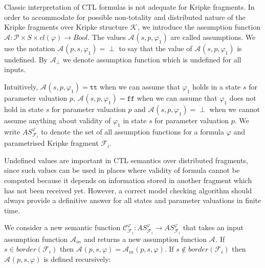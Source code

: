\documentclass[12pt,oneside]{fithesis2}
\newcommand{\as}[1][]{\ensuremath{\mathcal{A}_{#1}}}
\newcommand{\asemt}{\as[\perp]}
\newcommand{\ain}{\mathcal{A}_{in}}
\newcommand{\ASphi}{\ensuremath{AS_{\kf{i}{}}^\varphi}}
\newcommand{\sem}{\ensuremath{\mathcal{C}_{\kf{i}{}}^\varphi}}
\newcommand{\true}{\ensuremath{\texttt{tt}}}
\newcommand{\false}{\ensuremath{\texttt{ff}}}
\newcommand{\ks}[1][]{\ensuremath{\mathcal{K}_{#1}}}
\newcommand{\kf}[2]{\ensuremath{\mathcal{F}^{#2}_{#1}}}
\newcommand{\params}{\mathcal{P}}
\begin{document}
			Classic interpretation of CTL formulas is not adequate for Kripke fragments. In order to accommodate for possible non-totality and distributed nature of the Kripke fragments over Kripke structure $\ks$, we introduce the assumption function $\as : \params \times S \times cl(\varphi) \rightarrow Bool $. The values $\as(s, p, \varphi_1)$ are called assumptions. We use the notation $\as(p, s, \varphi_1) = \perp $ to say that the value of $\as(s, p, \varphi_1)$ is undefined. By $\asemt$ we denote assumption function which is undefined for all inputs.
			
			Intuitively, $\as(s, p, \varphi_1) = \true$ when we can assume that $\varphi_1$ holds in a state $s$ for parameter valuation $p$, $\as(s, p, \varphi_1) = \false$ when we can assume that $\varphi_1$ does not hold in state $s$ for parameter valuation $p$ and $\as(s, p, \varphi_1) = \perp$ when we cannot assume anything about validity of $\varphi_1$ in state $s$ for parameter valuation $p$. We write $\ASphi$ to denote the set of all assumption functions for a formula $\varphi$ and parametrised Kripke fragment $\kf{i}{}$.
			
			Undefined values are important in CTL semantics over dis\-trib\-uted fragments, since such values can be used in places where validity of formula cannot be computed because it depends on information stored in another fragment which has not been received yet. However, a correct model checking algorithm should always provide a definitive answer for all states and parameter valuations in finite time.
			
			We consider a new semantic function $\sem: \ASphi \rightarrow \ASphi$ that takes an input assumption function $\ain$ and returns a new assumption function  $\as$. If $ s \in \mathit{border}(\kf{i}{})$ then $\as(p,s,\varphi) = \ain(p,s,\varphi)$.  If $ s \notin \mathit{border}(\kf{i}{})$ then $\as(p,s,\varphi)$ is defined recursively:
		
\begingroup		
\scalefont{0.9}{
\begin{equation*}
	\as(p, s, Q) = 
   	\begin{dcases}
    	\begin{split}
			\true
      	\end{split}
      & \text{\parbox{8cm}{$Q \in L_i(s)$}} \\
      	\begin{split}
       		\false
      	\end{split}
      & \text{otherwise}
   	\end{dcases}
\end{equation*}		
}				
\endgroup
			
\end{document}
